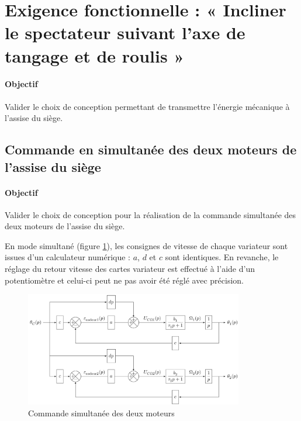 
\section{Exigence fonctionnelle : « Incliner le spectateur suivant l'axe de tangage et de roulis »}

\paragraph{Objectif} Valider le choix de conception permettant de transmettre l'énergie mécanique à l'assise du siège.

\subsection{Commande en simultanée des deux moteurs de l'assise du siège}

\paragraph{Objectif} Valider le choix de conception pour la réalisation de la commande simultanée des deux moteurs de l'assise du siège.

En mode simultané (figure \ref{fig19}), les consignes de vitesse de chaque variateur sont issues d'un calculateur numérique : $a$, $d$ et $c$ sont identiques. En revanche, le réglage du retour vitesse des cartes variateur est effectué à l'aide d'un potentiomètre et celui-ci peut ne pas avoir été réglé avec précision. 

\begin{figure}[H]
\centering
\includegraphics[width=0.85\textwidth]{img/img19}
\caption{\label{fig19}Commande simultanée des deux moteurs}
\end{figure}


